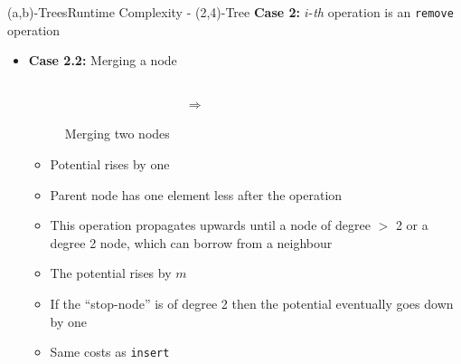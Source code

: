 \begin{frame}{(a,b)-Trees}{Runtime Complexity - (2,4)-Tree}
  \textbf{Case 2:}
  {\color{Mittel-Blau}$i$}-\textit{th} operation is an
  \texttt{\color{Mittel-Blau}remove} operation
  \begin{itemize}
    \item<2->
      \textbf{Case 2.2:} Merging a node
        \begin{figure}
    \begin{columns}
      \begin{column}{0.35\linewidth}
        \begin{adjustbox}{width=\linewidth}
          
        \end{adjustbox}
      \end{column}
      \begin{column}{0.1\linewidth}
        \begin{center}
          $\Rightarrow$
        \end{center}
      \end{column}
      \begin{column}{0.35\linewidth}
        \begin{adjustbox}{width=0.85\linewidth}
          
        \end{adjustbox}
      \end{column}
    \end{columns}
    \caption{Merging two nodes}
    \label{fig:a_b_tree:merge_potential}
        \end{figure}
    \vspace{-1.0em}    
    \begin{itemize}
      \item<3->
        Potential rises by one
      \item<4->
        Parent node has one element less after the operation
      \item<5->
        This operation propagates upwards until a node of degree $>$ 2
        or a degree 2 node, which can borrow from a neighbour
      \item<6->
        The potential rises by {\color{Mittel-Blau}$m$}
      \item<7->
        If the \enquote{stop-node} is of {\color{Mittel-Blau}degree 2} then the
        potential eventually goes down by one
      \item<8->
        Same costs as \texttt{\color{Mittel-Blau}insert}
    \end{itemize}
  \end{itemize}
\end{frame}

